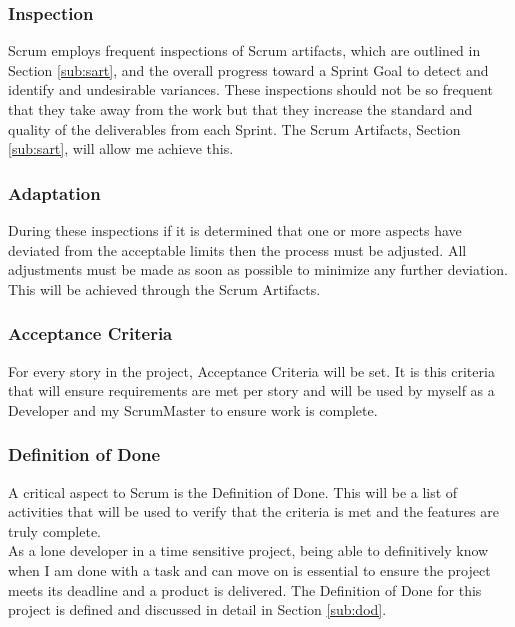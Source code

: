 \subsubsection{Inspection}
Scrum employs frequent inspections of Scrum artifacts, which are outlined in Section \ref{sub:sart}, and the overall progress toward a Sprint Goal to detect and identify and undesirable variances. These inspections should not be so frequent that they take away from the work but that they increase the standard and quality of the deliverables from each Sprint. The Scrum Artifacts, Section \ref{sub:sart}, will allow me achieve this.
\subsubsection{Adaptation}
During these inspections if it is determined that one or more aspects have deviated from the acceptable limits then the process must be adjusted. All adjustments must be made as soon as possible to minimize any further deviation. This will be achieved through the Scrum Artifacts.

\subsubsection{Acceptance Criteria}
\label{sub:ac}
For every story in the project, Acceptance Criteria will be set. It is this criteria that will ensure requirements are met per story and will be used by myself as a Developer and my ScrumMaster to ensure work is complete.

\subsubsection{Definition of Done}
A critical aspect to Scrum is the Definition of Done. This will be a list of activities that will be used to verify that the criteria is met and the features are truly complete.
\\ As a lone developer in a time sensitive project, being able to definitively know when I am done with a task and can move on is essential to ensure the project meets its deadline and a product is delivered. The Definition of Done for this project is defined and discussed in detail in Section \ref{sub:dod}.

\newpage
